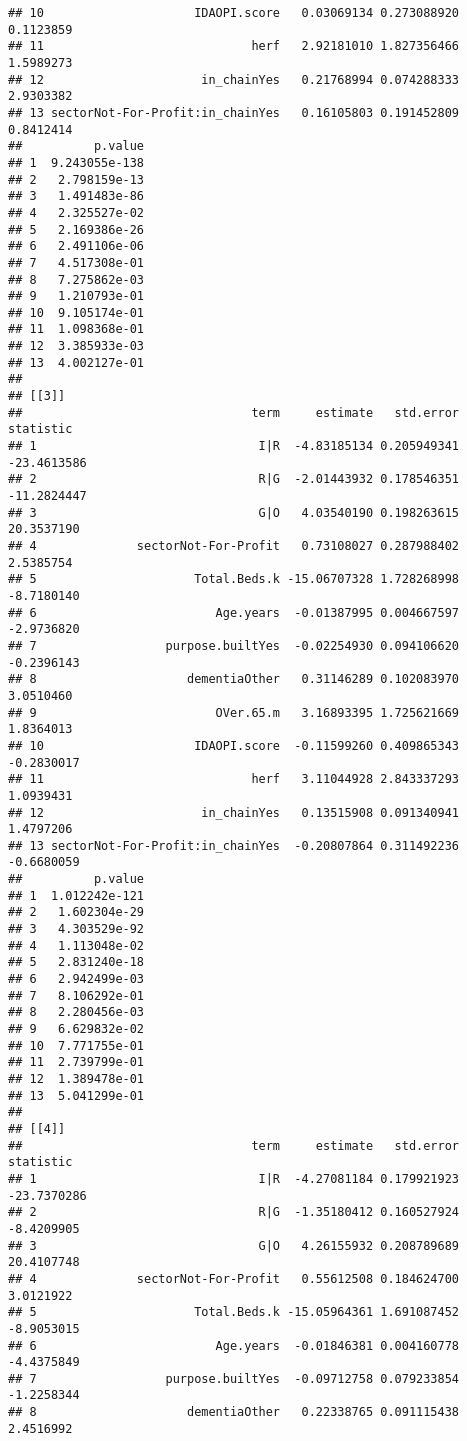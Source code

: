 \documentclass[]{article}
\begin{document}
\begin{verbatim}
## 10                     IDAOPI.score   0.03069134 0.273088920   0.1123859
## 11                             herf   2.92181010 1.827356466   1.5989273
## 12                      in_chainYes   0.21768994 0.074288333   2.9303382
## 13 sectorNot-For-Profit:in_chainYes   0.16105803 0.191452809   0.8412414
##          p.value
## 1  9.243055e-138
## 2   2.798159e-13
## 3   1.491483e-86
## 4   2.325527e-02
## 5   2.169386e-26
## 6   2.491106e-06
## 7   4.517308e-01
## 8   7.275862e-03
## 9   1.210793e-01
## 10  9.105174e-01
## 11  1.098368e-01
## 12  3.385933e-03
## 13  4.002127e-01
## 
## [[3]]
##                                term     estimate   std.error   statistic
## 1                               I|R  -4.83185134 0.205949341 -23.4613586
## 2                               R|G  -2.01443932 0.178546351 -11.2824447
## 3                               G|O   4.03540190 0.198263615  20.3537190
## 4              sectorNot-For-Profit   0.73108027 0.287988402   2.5385754
## 5                      Total.Beds.k -15.06707328 1.728268998  -8.7180140
## 6                         Age.years  -0.01387995 0.004667597  -2.9736820
## 7                  purpose.builtYes  -0.02254930 0.094106620  -0.2396143
## 8                     dementiaOther   0.31146289 0.102083970   3.0510460
## 9                         OVer.65.m   3.16893395 1.725621669   1.8364013
## 10                     IDAOPI.score  -0.11599260 0.409865343  -0.2830017
## 11                             herf   3.11044928 2.843337293   1.0939431
## 12                      in_chainYes   0.13515908 0.091340941   1.4797206
## 13 sectorNot-For-Profit:in_chainYes  -0.20807864 0.311492236  -0.6680059
##          p.value
## 1  1.012242e-121
## 2   1.602304e-29
## 3   4.303529e-92
## 4   1.113048e-02
## 5   2.831240e-18
## 6   2.942499e-03
## 7   8.106292e-01
## 8   2.280456e-03
## 9   6.629832e-02
## 10  7.771755e-01
## 11  2.739799e-01
## 12  1.389478e-01
## 13  5.041299e-01
## 
## [[4]]
##                                term     estimate   std.error   statistic
## 1                               I|R  -4.27081184 0.179921923 -23.7370286
## 2                               R|G  -1.35180412 0.160527924  -8.4209905
## 3                               G|O   4.26155932 0.208789689  20.4107748
## 4              sectorNot-For-Profit   0.55612508 0.184624700   3.0121922
## 5                      Total.Beds.k -15.05964361 1.691087452  -8.9053015
## 6                         Age.years  -0.01846381 0.004160778  -4.4375849
## 7                  purpose.builtYes  -0.09712758 0.079233854  -1.2258344
## 8                     dementiaOther   0.22338765 0.091115438   2.4516992

\end{verbatim}
\end{document}
